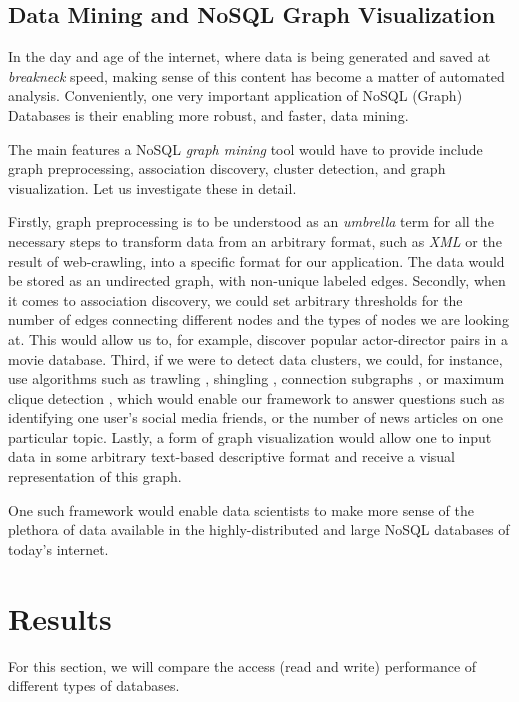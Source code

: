 \documentclass[10pt,        %
               a4paper,     %
               journal,     %
               ]{IEEEtran}
\begin{document}
\subsection{Data Mining and NoSQL Graph Visualization}
In the day and age of the internet, where data is being generated and saved at \textit{breakneck} speed, making sense of this content has become a matter of automated analysis. Conveniently, one very important application of NoSQL (Graph) Databases is their enabling more robust, and faster, data mining. \par
The main features a NoSQL \textit{graph mining} tool would have to provide include graph preprocessing, association discovery, cluster detection, and graph visualization. Let us investigate these in detail. \par
Firstly, graph preprocessing is to be understood as an \textit{umbrella} term for all the necessary steps to transform data from an arbitrary format, such as \textit{XML} or the result of web-crawling, into a specific format for our application. The data would be stored as an undirected graph, with non-unique labeled edges. \cite{IEEEpaper2:mining} Secondly, when it comes to association discovery, we could set arbitrary thresholds for the number of edges connecting different nodes and the types of nodes we are looking at. This would allow us to, for example, discover popular actor-director pairs in a movie database. Third, if we were to detect data clusters, we could, for instance, use algorithms such as trawling \cite{paper_2_ref_1}, shingling \cite{paper_2_ref_2}, connection subgraphs \cite{paper_2_ref_3}, or maximum clique detection \cite{paper_2_ref_4}, which would enable our framework to answer questions such as identifying one user's social media friends, or the number of news articles on one particular topic. Lastly, a form of graph visualization would allow one to input data in some arbitrary text-based descriptive format and receive a visual representation of this graph. \par
One such framework would enable data scientists to make more sense of the plethora of data available in the highly-distributed and large NoSQL databases of today's internet. 

\section{Results} 
For this section, we will compare the access (read and write) performance of different types of databases. 
\end{document}
